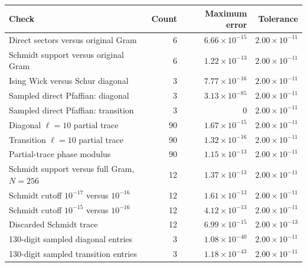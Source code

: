\begin{center}\begin{minipage}{\linewidth}\centering\small\captionsetup{hypcap=false}\begin{tabular}{lrrr}\toprule
Check & Count & Maximum error & Tolerance\\\midrule
Direct sectors versus original Gram & 6 & $6.66\!\times\!10^{-15}$ & $2.00\!\times\!10^{-11}$\\
Schmidt support versus original Gram & 6 & $1.22\!\times\!10^{-13}$ & $2.00\!\times\!10^{-11}$\\
Ising Wick versus Schur diagonal & 3 & $7.77\!\times\!10^{-16}$ & $2.00\!\times\!10^{-11}$\\
Sampled direct Pfaffian: diagonal & 3 & $3.13\!\times\!10^{-85}$ & $2.00\!\times\!10^{-11}$\\
Sampled direct Pfaffian: transition & 3 & 0 & $2.00\!\times\!10^{-11}$\\
\midrule
Diagonal $\ell=10$ partial trace & 90 & $1.67\!\times\!10^{-15}$ & $2.00\!\times\!10^{-11}$\\
Transition $\ell=10$ partial trace & 90 & $1.32\!\times\!10^{-16}$ & $2.00\!\times\!10^{-11}$\\
Partial-trace phase modulus & 90 & $1.15\!\times\!10^{-13}$ & $2.00\!\times\!10^{-11}$\\
Schmidt support versus full Gram, $N=256$ & 12 & $1.37\!\times\!10^{-13}$ & $2.00\!\times\!10^{-11}$\\
Schmidt cutoff $10^{-17}$ versus $10^{-16}$ & 12 & $1.61\!\times\!10^{-13}$ & $2.00\!\times\!10^{-11}$\\
Schmidt cutoff $10^{-15}$ versus $10^{-16}$ & 12 & $4.12\!\times\!10^{-13}$ & $2.00\!\times\!10^{-11}$\\
Discarded Schmidt trace & 12 & $6.99\!\times\!10^{-15}$ & $2.00\!\times\!10^{-13}$\\
130-digit sampled diagonal entries & 3 & $1.08\!\times\!10^{-40}$ & $2.00\!\times\!10^{-11}$\\
130-digit sampled transition entries & 3 & $1.18\!\times\!10^{-43}$ & $2.00\!\times\!10^{-11}$\\
\bottomrule\end{tabular}\label{tab:complement-extension-checks}\end{minipage}\end{center}
